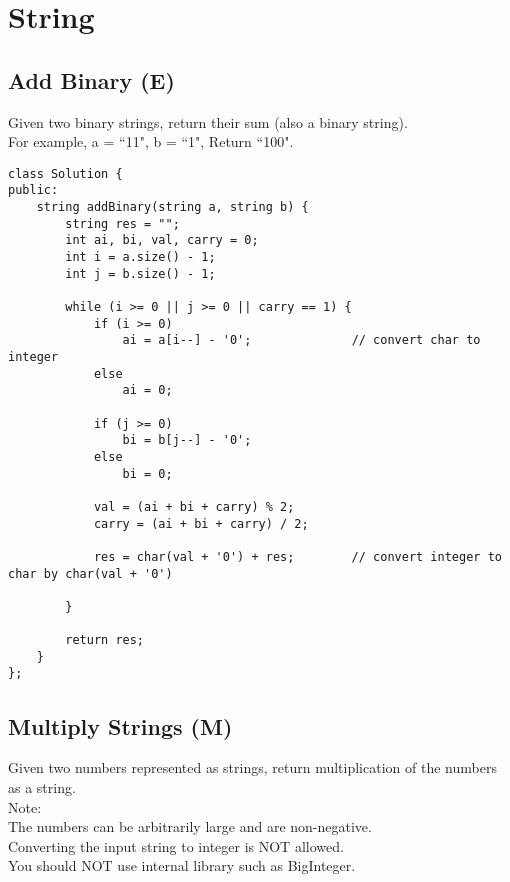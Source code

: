 \chapter{String}


\section{Add Binary (E)}
Given two binary strings, return their sum (also a binary string). \\

For example, a = ``11", b = ``1", Return ``100". \\ 

\begin{lstlisting}
class Solution {
public:
    string addBinary(string a, string b) {
        string res = "";
        int ai, bi, val, carry = 0;
        int i = a.size() - 1;
        int j = b.size() - 1;
        
        while (i >= 0 || j >= 0 || carry == 1) {
            if (i >= 0)
                ai = a[i--] - '0';              // convert char to integer
            else
                ai = 0;
                
            if (j >= 0)
                bi = b[j--] - '0';
            else
                bi = 0;
                
            val = (ai + bi + carry) % 2;
            carry = (ai + bi + carry) / 2;
            
            res = char(val + '0') + res;        // convert integer to char by char(val + '0') 
            
        }
        
        return res;
    }
};
\end{lstlisting}


\section{Multiply Strings (M)}
Given two numbers represented as strings, return multiplication of the numbers as a string.\\

Note:\\
    The numbers can be arbitrarily large and are non-negative.\\
    Converting the input string to integer is NOT allowed.\\
    You should NOT use internal library such as BigInteger.\\

